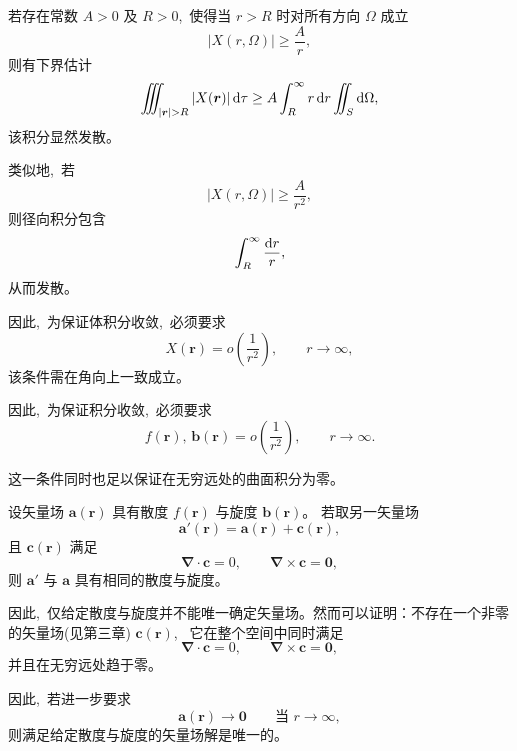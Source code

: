 若存在常数 $A>0$ 及 $R>0$, \,使得当 $r>R$ 时对所有方向
$\Omega$ 成立
\begin{equation*}
|X(r,\Omega)| \ge \frac{A}{r},
\end{equation*}
则有下界估计
\begin{equation*}
\iiint_{|\boldsymbol r|>R} |X(\boldsymbol r)|\dif\tau
\ge
A\int_R^\infty r\dif r
\iint_{S}\dif\Omega,
\end{equation*}
该积分显然发散。

类似地, \,若
\begin{equation*}
|X(r,\Omega)| \ge \frac{A}{r^2},
\end{equation*}
则径向积分包含
\[
\int_R^\infty \frac{\dif r}{r},
\]
从而发散。

因此, \,为保证体积分收敛, \,必须要求
\begin{equation}
X(\boldsymbol r)=o\!\left(\frac{1}{r^2}\right),
\qquad r\to\infty,
\end{equation}
该条件需在角向上一致成立。


因此, \,为保证积分收敛, \,必须要求
\begin{equation}
f(\boldsymbol r),\, \boldsymbol b(\boldsymbol r)
= o\!\left(\frac{1}{r^2}\right),
\qquad r\to\infty.
\end{equation}

这一条件同时也足以保证在无穷远处的曲面积分为零。



设矢量场 $\boldsymbol a(\boldsymbol r)$ 具有散度
$f(\boldsymbol r)$ 与旋度 $\boldsymbol b(\boldsymbol r)$。
若取另一矢量场
\begin{equation*}
\boldsymbol a'(\boldsymbol r)
=
\boldsymbol a(\boldsymbol r)+\boldsymbol c(\boldsymbol r),
\end{equation*}
且 $\boldsymbol c(\boldsymbol r)$ 满足
\begin{equation*}
\boldsymbol{\nabla}\cdot\boldsymbol c=0,
\qquad
\boldsymbol{\nabla}\times\boldsymbol c=\boldsymbol 0,
\end{equation*}
则 $\boldsymbol a'$ 与 $\boldsymbol a$ 具有相同的散度与旋度。

因此, \,仅给定散度与旋度并不能唯一确定矢量场。然而可以证明：不存在一个非零的矢量场(见第三章)
$\boldsymbol c(\boldsymbol r)$, \,
它在整个空间中同时满足
\begin{equation*}
\boldsymbol{\nabla}\cdot\boldsymbol c=0,
\qquad
\boldsymbol{\nabla}\times\boldsymbol c=\boldsymbol 0,
\end{equation*}
并且在无穷远处趋于零。

因此, \,若进一步要求
\begin{equation*}
\boldsymbol a(\boldsymbol r)\to \boldsymbol 0
\qquad \text{当 } r\to\infty,
\end{equation*}
则满足给定散度与旋度的矢量场解是唯一的。



